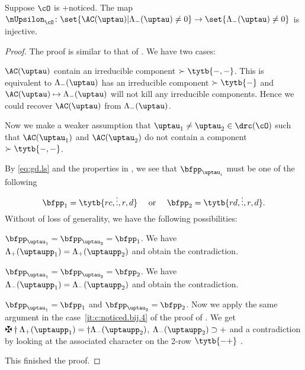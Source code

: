 \documentclass[ssunip]{subfiles}
\begin{document}
\begin{lem}\label{c:gd.pnoticed.n}
    Suppose $\cO$ is +noticed.
    The map $\nUpsilon_{\cO}\colon \set{\oAC{\uptau}|\nAC{\uptau}\neq 0}\rightarrow \set{\nAC{\uptau}\neq 0}$
    is injective.
\end{lem}
\begin{proof}
  The proof is similar to that of .
    We have two cases:
    \begin{enumPF}
      \item $\oAC{\uptau}$ contain an irreducible component $\succ \tytb{-,-}$.
      This is equivalent to $\nAC{\uptau}$ has an irreducible component
      $\succ\tytb{-}$ and $\oAC{\uptau}\mapsto \nAC{\uptau}$ will
      not kill any irreducible components. Hence we could recover $\oAC{\uptau}$
      from $\nAC{\uptau}$.%

      \item Now we make a weaker assumption that $\uptau_{1}\neq \uptau_{2}\in \drc(\cO)$ such that
      $\oAC{\uptau_{1}}$ and $\oAC{\uptau_{2}}$ do not contain a component
      $\succ \tytb{-,-}$.

      By \eqref{eq:gd.ls} and the properties in , we
      see that $\bfpp_{\uptau_{i}}$ must be one of the following
      \[
        \bfpp_{1}=  \tytb{rc,\vdots,r,d} \quad \text{ or } \quad \bfpp_{2}= \tytb{rd,\vdots,r,d}.
      \]
      Without of loss of generality, we have the following possibilities:
      \begin{enumPF}
        \item $\bfpp_{\uptau_{1}}=\bfpp_{\uptau_{2}}=\bfpp_{1}$. We have
        $\pAC{\uptaupp_{1}}=\pAC{\uptaupp_{2}}$ and obtain the contradiction.
        \item $\bfpp_{\uptau_{1}}=\bfpp_{\uptau_{2}}=\bfpp_{2}$. We have
        $\nAC{\uptaupp_{1}}=\nAC{\uptaupp_{2}}$ and obtain the contradiction.
        \item $\bfpp_{\uptau_{1}}=\bfpp_{1}$ and $\bfpp_{\uptau_{2}}=\bfpp_{2}$.
        Now we apply the same argument in the case~\ref{it:c:noticed.bij.4} of
        the proof of . We get
        $\maltese \dagger\pAC{\uptaupp_{1}}=\dagger \nAC{\uptaupp_{2}}$,
        $\nAC{\uptaupp_{2}} \supset +$ and a contradiction by looking at the
        associated character on the 2-row $\tytb{-+}$ .
      \end{enumPF}
    \end{enumPF}
    This finished the proof.
\end{proof}
\end{document}
